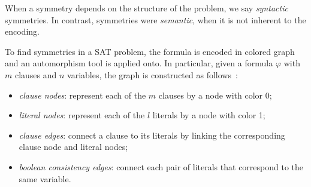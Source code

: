 When a symmetry depends on the structure of the problem, we say \emph{syntactic} symmetries. 
In contrast, symmetries were \emph{semantic}, when it is not inherent to the encoding.

To find symmetries in a SAT problem, the formula is encoded in colored graph
and an automorphism tool is applied onto. In particular, given a formula $\varphi$ with
$m$ clauses and $n$ variables, the graph is constructed as follows~\cite{biere2009handbook}:
\begin{itemize}
 \item \emph{clause nodes}: represent each of the $m$ clauses by a node with color 0;
 \item \emph{literal nodes}: represent each of the $l$ literals by a node with color 1;
 \item \emph{clause edges}: connect a clause to its literals by linking the corresponding  clause node and literal nodes;
 \item \emph{boolean consistency edges}: connect each pair of literals that correspond to the same variable.
\end{itemize}

